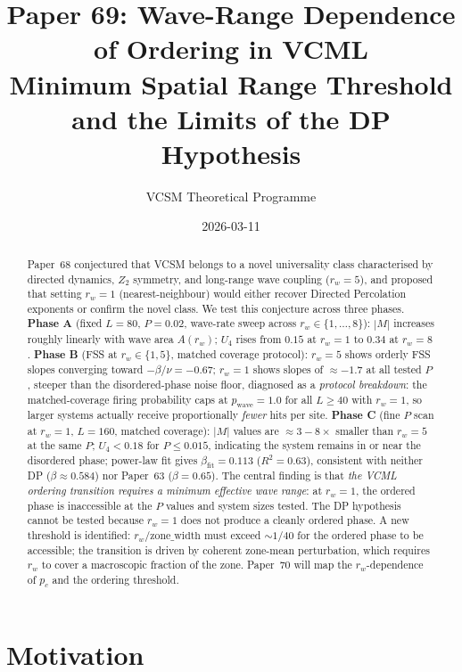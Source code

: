 \documentclass[twocolumn,10pt]{article}
\title{\textbf{Paper 69: Wave-Range Dependence of Ordering in VCML}\\
  \large Minimum Spatial Range Threshold and the Limits of the DP Hypothesis}
\author{VCSM Theoretical Programme}
\date{2026-03-11}
\begin{document}
\maketitle

\begin{abstract}
Paper~68 conjectured that VCSM belongs to a novel universality class characterised
by directed dynamics, $Z_2$ symmetry, and long-range wave coupling ($r_w=5$),
and proposed that setting $r_w=1$ (nearest-neighbour) would either recover
Directed Percolation exponents or confirm the novel class.
We test this conjecture across three phases.
\textbf{Phase A} (fixed $L=80$, $P=0.02$, wave-rate sweep across
$r_w\in\{1,\ldots,8\}$): $|M|$ increases roughly linearly with wave area
$A(r_w)$; $U_4$ rises from $0.15$ at $r_w=1$ to $0.34$ at $r_w=8$.
\textbf{Phase B} (FSS at $r_w\in\{1,5\}$, matched coverage protocol):
$r_w=5$ shows orderly FSS slopes converging toward $-\beta/\nu=-0.67$;
$r_w=1$ shows slopes of $\approx-1.7$ at all tested $P$, steeper than the
disordered-phase noise floor, diagnosed as a \emph{protocol breakdown}:
the matched-coverage firing probability caps at $p_\mathrm{wave}=1.0$ for
all $L\geq40$ with $r_w=1$, so larger systems actually receive
proportionally \emph{fewer} hits per site.
\textbf{Phase C} (fine $P$ scan at $r_w=1$, $L=160$, matched coverage):
$|M|$ values are $\approx 3-8\times$ smaller than $r_w=5$ at the same $P$;
$U_4<0.18$ for $P\leq0.015$, indicating the system remains in or near the
disordered phase; power-law fit gives $\beta_\mathrm{fit}=0.113$ ($R^2=0.63$),
consistent with neither DP ($\beta\approx0.584$) nor Paper~63 ($\beta=0.65$).
The central finding is that \emph{the VCML ordering transition requires a
minimum effective wave range}: at $r_w=1$, the ordered phase is inaccessible
at the $P$ values and system sizes tested.
The DP hypothesis cannot be tested because $r_w=1$ does not produce a
cleanly ordered phase.
A new threshold is identified: $r_w/\text{zone\_width}$ must exceed $\sim1/40$
for the ordered phase to be accessible; the transition is driven by coherent
zone-mean perturbation, which requires $r_w$ to cover a macroscopic fraction
of the zone.
Paper~70 will map the $r_w$-dependence of $p_c$ and the ordering threshold.
\end{abstract}

\section{Motivation}
\end{document}
